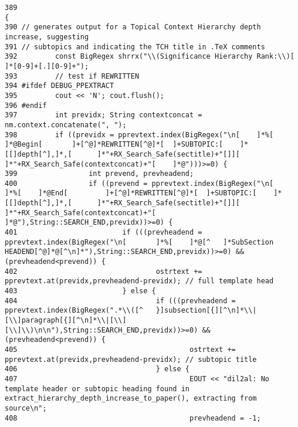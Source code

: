 \footnotesize\begin{verbatim}389                                                                                                                                                                                                                         {
390 // generates output for a Topical Context Hierarchy depth increase, suggesting
391 // subtopics and indicating the TCH title in .TeX comments
392         const BigRegex shrrx("\\(Significance Hierarchy Rank:\\)[       ]*[0-9]+[.][0-9]+");
393         // test if REWRITTEN
394 #ifdef DEBUG_PPEXTRACT
395         cout << 'N'; cout.flush();
396 #endif
397         int previdx; String contextconcat = nm.context.concatenate(", ");
398         if ((previdx = pprevtext.index(BigRegex("\n[    ]*%[    ]*@Begin[       ]+[^@]*REWRITTEN[^@]*[  ]+SUBTOPIC:[    ]*[[]depth[^],]*,[      ]*"+RX_Search_Safe(sectitle)+"[]][      ]*"+RX_Search_Safe(contextconcat)+"[    ]*@")))>=0) {
399                 int prevend, prevheadend;
400                 if ((prevend = pprevtext.index(BigRegex("\n[    ]*%[    ]*@End[         ]+[^@]*REWRITTEN[^@]*[  ]+SUBTOPIC:[    ]*[[]depth[^],]*,[      ]*"+RX_Search_Safe(sectitle)+"[]][      ]*"+RX_Search_Safe(contextconcat)+"[    ]*@"),String::SEARCH_END,previdx))>=0) {
401                         if (((prevheadend = pprevtext.index(BigRegex("\n[       ]*%[    ]*@[^   ]*SubSection HEADEND[^@]*@[^\n]*"),String::SEARCH_END,previdx))>=0) && (prevheadend<prevend)) {
402                                 ostrtext += pprevtext.at(previdx,prevheadend-previdx); // full template head
403                         } else {
404                                 if (((prevheadend = pprevtext.index(BigRegex(".*\\([^   }]subsection[{][^\n]*\\|[\\]paragraph[{][^\n]*\\|[\\][\\]\\)\n\n"),String::SEARCH_END,previdx))>=0) && (prevheadend<prevend)) {
405                                         ostrtext += pprevtext.at(previdx,prevheadend-previdx); // subtopic title
406                                 } else {
407                                         EOUT << "dil2al: No template header or subtopic heading found in extract_hierarchy_depth_increase_to_paper(), extracting from source\n";
408                                         prevheadend = -1;

\end{verbatim}
